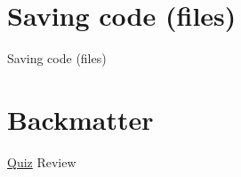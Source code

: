 \documentclass[
  11pt,
  ignorenonframetext,
]{beamer}
\begin{document}
\hypertarget{saving-code-files}{%
\section{Saving code (files)}\label{saving-code-files}}

\begin{frame}{Saving code (files)}
\end{frame}

\hypertarget{backmatter}{%
\section{Backmatter}\label{backmatter}}

\begin{frame}[fragile]{\protect\hyperlink{pop-quiz}{Quiz} Review}
\protect\hypertarget{quiz-review}{}
\end{frame}
\end{document}

